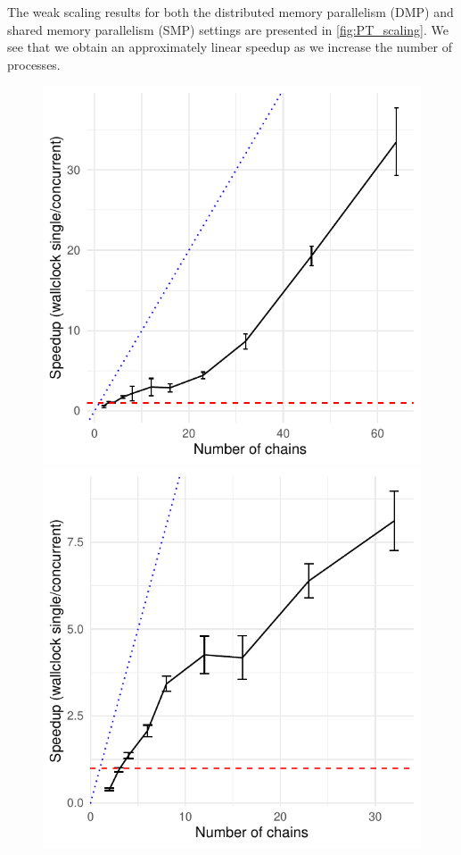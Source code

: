 The weak scaling results for both the distributed memory parallelism (DMP) and 
shared memory parallelism (SMP) settings are presented in \cref{fig:PT_scaling}. 
We see that we obtain an approximately linear speedup as we increase the number of processes. 

\begin{figure}[t]
    \centering
    \begin{minipage}{0.4\textwidth}
      \centering
      \includegraphics[width=\textwidth]{../img/speedup_distributed.pdf}
    \end{minipage}
    \begin{minipage}{0.4\textwidth}
      \centering
      \includegraphics[width=\textwidth]{../img/speedup_parallel.pdf}

\end{minipage}
\end{figure}
